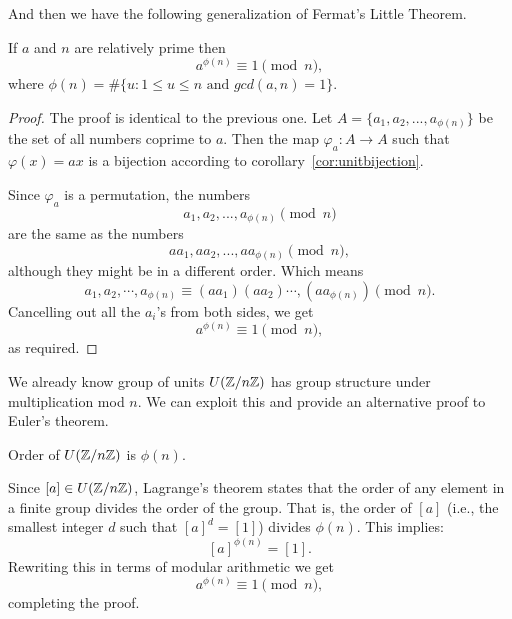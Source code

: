 And then we have the following generalization of Fermat's Little Theorem.

\begin{theorem}
    If $a$ and $n$ are relatively prime then \[a^{\phi(n)} \equiv 1 \pmod{n},\] where $\phi(n) = \#\{u: 1 \le u \le n \text{ and } gcd(a,n)=1\}$.
\end{theorem}
\begin{proof}
    The proof is identical to the previous one. Let $A= \{a_1, a_2, ..., a_{\phi(n)}\}$ be the set of all numbers coprime to $a$. Then the map $\varphi_a: A \rightarrow A$ such that $\varphi(x) = ax$ is a bijection according to corollary~\ref{cor:unitbijection}.
    
    Since $\varphi_a$ is a permutation, the numbers \[a_1, a_2, ..., a_{\phi(n)} \pmod{n}\] are the same as the numbers \[aa_1, aa_2, ..., aa_{\phi(n)} \pmod{n},\]
    although they might be in a different order. Which means \[a_1, a_2, \cdots, a_{\phi(n)} \equiv (aa_1) (aa_2) \cdots, (aa_{\phi(n)}) \pmod{n}.\] Cancelling out all the $a_i$'s from both sides, we get \[a^{\phi(n)} \equiv 1 \pmod{n},\]
    as required.
\end{proof}
We already know group of units $U(\mathbb{Z}/n\mathbb{Z})$ has group structure under multiplication mod $n$. We can exploit this and provide an alternative proof to Euler's theorem.
\begin{replacementproof}
    Order of $U(\mathbb{Z}/n\mathbb{Z})$ is $\phi(n)$.

    Since $[a] \in U(\mathbb{Z}/n\mathbb{Z})$, Lagrange’s theorem states that the order of any element in a finite group divides the order of the group. That is, the order of $[a]$ (i.e., the smallest integer $d$ such that $[a]^d = [1]$) divides $\phi(n)$. This implies:
    \[
    [a]^{\phi(n)} = [1].
    \]
    Rewriting this in terms of modular arithmetic we get
    \[
    a^{\phi(n)} \equiv 1 \pmod{n},
    \]
    completing the proof.
\end{replacementproof}